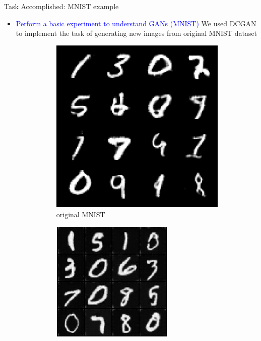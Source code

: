 \documentclass[10pt, a4paper]{beamer}
\begin{document}
\begin{frame}{Task Accomplished: MNIST example}
	\begin{itemize}
	\item
{\textcolor{blue}{Perform a basic experiment to understand GANs (MNIST)}
\linebreak \linebreak
We used DCGAN to implement the task of generating new images from original MNIST dataset}

\begin{figure}[h!]
  \centering
  \begin{subfigure}[b]{0.4\linewidth}
    \includegraphics[width=\linewidth]{mnist_ideal.png}
    \caption{original MNIST}
  \end{subfigure}
  \begin{subfigure}[b]{0.407\linewidth}
    \includegraphics[width=\linewidth]{mnist.png}

\end{subfigure}
\end{figure}
\end{itemize}
\end{frame}
\end{document}
